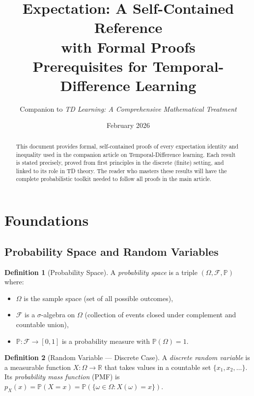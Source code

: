 \documentclass[11pt,a4paper]{article}
\title{\textbf{Expectation: A Self-Contained Reference\\with Formal Proofs}\\[10pt]
\large Prerequisites for Temporal-Difference Learning}
\author{Companion to \emph{TD Learning: A Comprehensive Mathematical Treatment}}
\date{February 2026}
\theoremstyle{definition}
\newtheorem{definition}{Definition}[section]
\theoremstyle{plain}
\theoremstyle{remark}
\newcommand{\R}{\mathbb{R}}
\newcommand{\Prob}{\mathbb{P}}
\begin{document}
\maketitle

\begin{abstract}
This document provides formal, self-contained proofs of every expectation identity and inequality used in the companion article on Temporal-Difference learning. Each result is stated precisely, proved from first principles in the discrete (finite) setting, and linked to its role in TD theory. The reader who masters these results will have the complete probabilistic toolkit needed to follow all proofs in the main article.
\end{abstract}

\tableofcontents
\newpage

\section{Foundations}
\label{sec:foundations}

\subsection{Probability Space and Random Variables}
\label{subsec:prob_space}

\begin{definition}[Probability Space]
\label{def:prob_space}
A \emph{probability space} is a triple $(\Omega, \mathcal{F}, \Prob)$ where:
\begin{itemize}[nosep]
    \item $\Omega$ is the sample space (set of all possible outcomes),
    \item $\mathcal{F}$ is a $\sigma$-algebra on $\Omega$ (collection of events closed under complement and countable union),
    \item $\Prob: \mathcal{F} \to [0,1]$ is a probability measure with $\Prob(\Omega) = 1$.
\end{itemize}
\end{definition}

\begin{definition}[Random Variable --- Discrete Case]
\label{def:random_variable}
A \emph{discrete random variable} is a measurable function $X: \Omega \to \R$ that takes values in a countable set $\{x_1, x_2, \ldots\}$. Its \emph{probability mass function} (PMF) is $p_X(x) = \Prob(X = x) = \Prob(\{\omega \in \Omega : X(\omega) = x\})$.
\end{definition}
\end{document}
